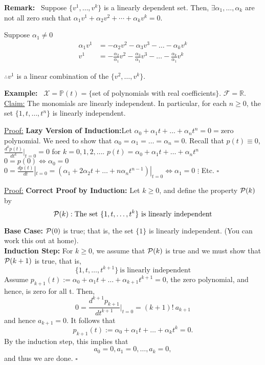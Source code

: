 \documentclass[letterpaper]{article}
\begin{document}
\noindent \textbf{Remark:}~ Suppose $\{v^1, \dots, v^k\}$ is a linearly dependent set. Then, $\exists\alpha_1, \dots, \alpha_k$ are not all zero such that $\alpha_1v^1+\alpha_2v^2+\dotsb+\alpha_kv^k=0$.

Suppose $\alpha_1\neq0$
    \begin{align*}
    \alpha_1v^1 &= -\alpha_2v^2-\alpha_3v^3-\dots-\alpha_kv^k\\
    v^1 &= -\frac{\alpha_2}{\alpha_1}v^2-\frac{\alpha_3}{\alpha_1}v^3-\dots-\frac{\alpha_k}{\alpha_1}v^k
    \end{align*}

$\therefore v^1$ is a linear combination of the $\{v^2,\dots,v^k\}$.

\noindent \textbf{Example:}~ $\mathcal{X}=\mathbb{P}(t)=\{$set of polynomials with real coefficients$\}$. $\mathcal{F}=\mathbb{R}$.
    \underline{Claim:} The monomials are linearly independent. In particular, for each $n\geq 0$, the set $\{1,t,\dots,t^n\}$ is linearly independent.

    \underline{Proof:} \textbf{Lazy Version of Induction:}Let $\alpha_0+\alpha_1t+\dots+\alpha_nt^n=0=$zero polynomial. We need to show that $\alpha_0=\alpha_1=\dots=\alpha_n=0$.
        \newline Recall that $p(t)\equiv0$, $\frac{d^kp(t)}{dt^k}|_{t=0}=0$ for $k=0,1,2,\dots$.
        \newline
        $p(t)=\alpha_0+\alpha_1t+\dots+\alpha_nt^n$
        \newline
        $0=p(0)\iff\alpha_0=0$
        \newline
        $0=\frac{dp(t)}{dt}|_{t=0}=(\alpha_1+2\alpha_2t+\dots+n\alpha_nt^{n-1})|_{t=0}\iff\alpha_1=0$
        \newline
        $\vdots$
        \newline
        Etc. $\square$
        
        \newpage
        
        \underline{Proof:} \textbf{Correct Proof by Induction:} Let $k\ge 0$, and define the property ${\cal P}(k)$ by
        $${\cal P}(k): \text{The set}~\{ 1, t, \ldots, t^k\}~\text{is linearly independent} $$
        
\textbf{Base Case:} ${\cal P}(0)$ is true; that is, the set $\{1\}$ is linearly independent. (You can work this out at home). \\

\textbf{Induction Step:} For $k\ge 0$, we assume that ${\cal P}(k)$ is true and we must show that ${\cal P}(k+1)$ is true, that is,
        $$\{ 1, t, \ldots, t^{k+1}\}~\text{is linearly independent} $$        
        Assume $p_{k+1}(t):=\alpha_0+\alpha_1t+\dots+\alpha_{k+1}t^{k+1}=0$, the zero polynomial, and hence, is zero for all t. Then,         
        $$0=\frac{d^{k+1} p_{k+1}}{dt^{k+1}}|_{t=0}=(k+1)! ~a_{k+1}$$
        and hence $a_{k+1}=0$. It follows that 
        $$p_{k+1}(t):=\alpha_0+\alpha_1t+\dots+\alpha_{k}t^{k}=0.$$
        By the induction step, this implies that 
        $$a_0=0, a_1=0, \ldots, a_k=0,$$
        and thus we are done. 
        \newline
       $\square$
       
\end{document}
